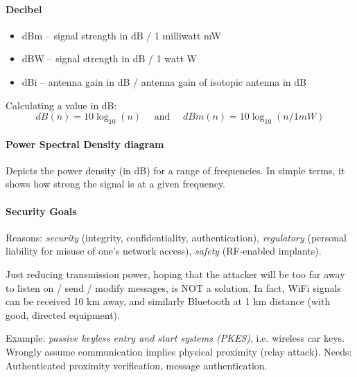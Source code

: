 \paragraph{Decibel}
\begin{itemize}
	\item dBm -- signal strength in dB / 1 milliwatt mW
	\item dBW -- signal strength in dB / 1 watt W
	\item dBi -- antenna gain in dB / antenna gain of isotopic antenna in dB
\end{itemize}
Calculating a value in dB:
$$ dB(n) = 10 \log_{10} (n) \quad \text{ and } \quad dBm(n) = 10 \log_{10} (n / 1 mW) $$

\paragraph{Power Spectral Density diagram}
Depicts the power density (in dB) for a range of frequencies.
In simple terms, it shows how strong the signal is at a given frequency.


\paragraph{Security Goals}
Reasons: \textit{security} (integrity, confidentiality, authentication), \textit{regulatory} (personal liability for misuse of one's network access), \textit{safety} (RF-enabled implants).

Just reducing transmission power, hoping that the attacker will be too far away to listen on / send / modify messages, is NOT a solution.
In fact, WiFi signals can be received 10 km away, and similarly Bluetooth at 1 km distance (with good, directed equipment).

Example: \textit{passive keyless entry and start systems (PKES)}, i.e. wireless car keys.
Wrongly assume communication implies physical proximity (relay attack).
Needs: Authenticated proximity verification, message authentication.

